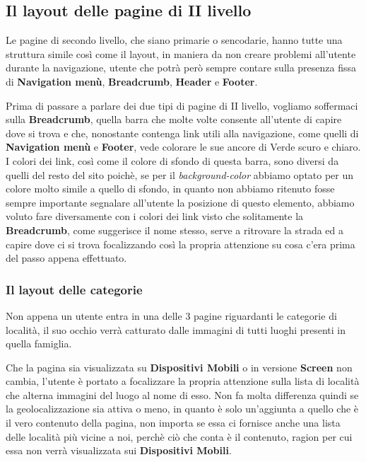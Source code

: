 \subsection{Il layout delle pagine di II livello}\label{sec:Pres-IIliv}
Le pagine di secondo livello, che siano primarie o sencodarie, hanno tutte una struttura simile così come il layout, in maniera da non creare problemi all'utente durante la navigazione, utente che potrà però sempre contare sulla presenza fissa di \textbf{Navigation menù}, \textbf{Breadcrumb}, \textbf{Header} e \textbf{Footer}.

Prima di passare a parlare dei due tipi di pagine di II livello, vogliamo soffermaci sulla \textbf{Breadcrumb}, quella barra che molte volte consente all'utente di capire dove si trova e che, nonostante contenga link utili alla navigazione, come quelli di \textbf{Navigation menù} e \textbf{Footer}, vede colorare le sue ancore di Verde scuro e chiaro. I colori dei link, così come il colore di sfondo di questa barra, sono diversi da quelli del resto del sito poichè, se per il \textit{background-color} abbiamo optato per un colore molto simile a quello di sfondo, in quanto non abbiamo ritenuto fosse sempre importante segnalare all'utente la posizione di questo elemento, abbiamo voluto fare diversamente con i colori dei link visto che solitamente la \textbf{Breadcrumb}, come suggerisce il nome stesso, serve a ritrovare la strada ed a capire dove ci si trova focalizzando così la propria attenzione su cosa c'era prima del passo appena effettuato.

\subsubsection{Il layout delle categorie}\label{sec:Pres-IIliv-cat}
Non appena un utente entra in una delle 3 pagine riguardanti le categorie di località, il suo occhio verrà catturato dalle immagini di tutti luoghi presenti in quella famiglia.

Che la pagina sia visualizzata su \textbf{Dispositivi Mobili} o in versione \textbf{Screen} non cambia, l'utente è portato a focalizzare la propria attenzione sulla lista di località che alterna immagini del luogo al nome di esso. Non fa molta differenza quindi se la geolocalizzazione sia attiva o meno, in quanto è solo un'aggiunta a quello che è il vero contenuto della pagina, non importa se essa ci fornisce anche una lista delle località più vicine a noi, perchè ciò che conta è il contenuto, ragion per cui essa non verrà visualizzata sui \textbf{Dispositivi Mobili}.

